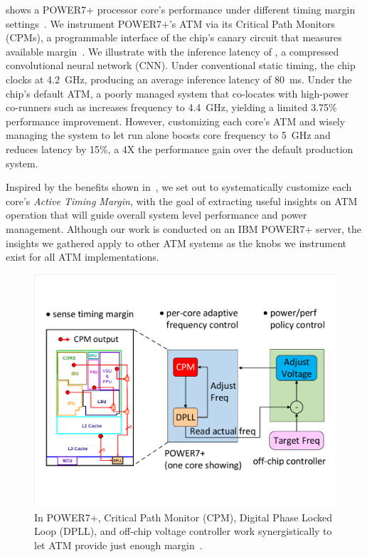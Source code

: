  shows a POWER7+ processor core's performance under different timing margin settings~\cite{sinharoy2011power7, floyd2011introducing}. We instrument POWER7+'s ATM via its Critical Path Monitors (CPMs), a programmable interface of the chip's canary circuit that measures available margin~\cite{lefurgy2011active, drake2013single}. We illustrate with the inference latency of , a compressed convolutional neural network (CNN). Under conventional static timing, the chip clocks at 4.2~GHz, producing an average inference latency of 80~ms. Under the chip's default ATM, a poorly managed system that co-locates  with high-power co-runners such as  increases frequency to 4.4~GHz, yielding a limited 3.75\% performance improvement. However, customizing each core's ATM and wisely managing the system to let  run alone boosts core frequency to 5~GHz and reduces latency by 15\%, a 4X the performance gain over the default production system.

Inspired by the benefits shown in~, we set out to systematically customize each core's \emph{Active Timing Margin}, with the goal of extracting useful insights on ATM operation that will guide overall system level performance and power management. Although our work is conducted on an IBM POWER7+ server, the insights we gathered apply to other ATM systems as the knobs we instrument exist for all ATM implementations.


\begin{figure}[t!]
  \centering
  \vspace{-0.2cm}
  \includegraphics[trim=20 80 20 80,clip,width=\linewidth]{graphs/process//atm-loop.pdf}
  \caption{In POWER7+, Critical Path Monitor (CPM), Digital Phase Locked Loop (DPLL), and off-chip voltage controller work synergistically to let ATM provide just enough margin~\cite{lefurgy2013active}.}
  \vspace{-0.5cm}
  \label{fig:active-margin-loop}
\end{figure}


